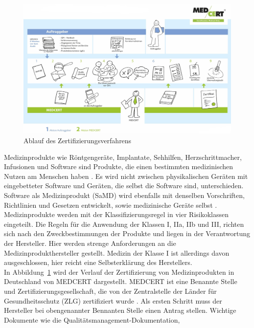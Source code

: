 \begin{figure}[h]
    \centering
    \includegraphics[width=1.0\textwidth]{images/Zertifizierungsablauf.jpg}
    \caption{\label{fig:Zertifizierungsablauf}
        Ablauf des Zertifizierungsverfahrens
        \protect{}
    }
\end{figure}
Medizinprodukte wie Röntgengeräte, Implantate, Sehhilfen, Herzschrittmacher, 
Infusionen und Software sind Produkte, die einen bestimmten medizinischen Nutzen am Menschen haben   \cite{Marktzugangsregelung}.
Es wird nicht zwischen physikalischen Geräten mit eingebetteter Software und Geräten, die selbst die Software sind, unterschieden. 
Software als Medizinprodukt (SaMD) wird ebenfalls mit denselben Vorschriften, Richtlinien und Gesetzen entwickelt, sowie medizinische Geräte selbst \cite{AI_in_EU}.\\
Medizinprodukte werden mit der Klassifizierungsregel in vier Risikoklassen eingeteilt.
Die Regeln für die Anwendung der Klassen I, IIa, IIb und III, 
richten sich nach den Zweckbestimmungen der Produkte und liegen in der Verantwortung der Hersteller\cite{Marktzugangsregelung}. Hier werden strenge Anforderungen an die Medizinprodukthersteller gestellt. 
Medizin der Klasse I ist allerdings davon ausgeschlossen, hier reicht eine Selbsterklärung des Herstellers.\\
In Abbildung~\ref{fig:Zertifizierungsablauf} wird der Verlauf der Zertifizierung von Medizinprodukten in Deutschland von MEDCERT dargestellt.
MEDCERT ist eine Benannte Stelle und Zertifizierungsgesellschaft,
die von der Zentralstelle der Länder für Gesundheitsschutz (ZLG) zertifiziert wurde \cite{Marktzugangsregelung}.
Als ersten Schritt muss der Hersteller bei obengenannter Bennanten Stelle einen Antrag stellen. Wichtige Dokumente wie die Qualitätsmanagement-Dokumentation,
